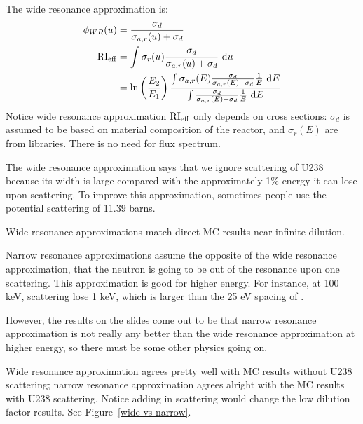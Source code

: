 \documentclass{school-22.211-notes}
\date{February 27, 2012}
\begin{document}
\maketitle

\clearpage
{}
The wide resonance approximation is: 
\begin{align}
\phi_{WR} (u) &= \frac{\sigma_d}{\sigma_{a,r} (u) +  \sigma_d } \\
\mathrm{RI}_{\mathrm{eff}} &= \int \sigma_r(u) \frac{\sigma_d}{\sigma_{a,r}(u) + \sigma_d} \mbox{ }\mathrm{d} u \\
&= \ln \left(\frac{E_2}{E_1} \right) \frac{ \int \sigma_{a,r}(E) \frac{\sigma_d}{\sigma_{a,r}(E) + \sigma_d} \frac{1}{E} \mbox{ }\mathrm{d} E}{ \int \frac{\sigma_d}{\sigma_{a,r}(E) + \sigma_d} \frac{1}{E} \mbox{ }\mathrm{d} E}
\end{align}
Notice wide resonance approximation $\mathrm{RI}_{\mathrm{eff}}$ only depends on cross sections: $\sigma_d$ is assumed to be based on material composition of the reactor, and $\sigma_r(E)$ are from libraries. There is no need for flux spectrum. 

The wide resonance approximation says that we ignore scattering of U238 because its width is large compared with the approximately 1\% energy it can lose upon scattering. To improve this approximation, sometimes people use the potential scattering of 11.39 barns. 

Wide resonance approximations match direct MC results near infinite dilution. 

Narrow resonance approximations assume the opposite of the wide resonance approximation, that the neutron is going to be out of the resonance upon one scattering. This approximation is good for higher energy. For instance, at 100 keV, scattering lose 1 keV, which is larger than the 25 eV spacing of . 

However, the results on the slides come out to be that narrow resonance approximation is not really any better than the wide resonance approximation at higher energy, so there must be some other physics going on. 

\clearpage
{}
Wide resonance approximation agrees pretty well with MC results without U238 scattering; narrow resonance approximation agrees alright with the MC results with U238 scattering. Notice adding in scattering would change the low dilution factor results. See Figure~\ref{wide-vs-narrow}.
\end{document}
